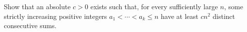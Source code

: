 Show that an absolute $c>0$ exists such that, for every sufficiently large $n$, some strictly increasing positive integers $a_1<\cdots<a_k\le n$ have at least $cn^2$ distinct consecutive sums.
